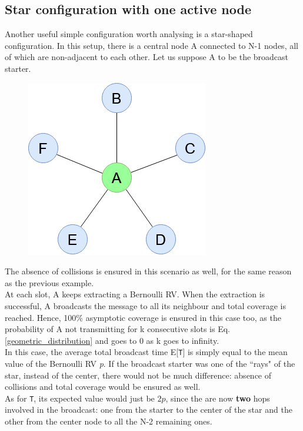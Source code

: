 \subsection{Star configuration with one active node}
Another useful simple configuration worth analysing is a star-shaped configuration. In this setup, there is a central node A connected to N-1 nodes, all of which are non-adjacent to each other. Let us suppose A to be the broadcast starter.
\begin{figure}[H]%
    \centering
	{{\includegraphics[scale=0.5]{img/star_graph.png} }}%
    \caption{}%
    \label{fig:star_graph}%
\end{figure}
The absence of collisions is ensured in this scenario as well, for the same reason as the previous example.\\
At each slot, A keeps extracting a Bernoulli RV. When the extraction is successful, A broadcasts the message to all its neighbour and total coverage is reached. Hence, 100\% asymptotic coverage is ensured in this case too, as the probability of A not transmitting for k consecutive slots is Eq. \ref{geometric_distribution} and goes to 0 as k goes to infinity.\\
In this case, the average total broadcast time E[\texttt{T}] is simply equal to the mean value of the Bernoulli RV \textit{p}.
If the broadcast starter was one of the ``rays" of the star, instead of the center, there would not be much difference: absence of collisions and total coverage would be ensured as well.\\
As for \texttt{T}, its expected value would just be $2p$, since the are now \textbf{two} hops involved in the broadcast: one from the starter to the center of the star and the other from the center node to all the N-2 remaining ones.

